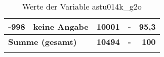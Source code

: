 \begin{longtable}{Xlrrr}
       -998 & keine Angabe & 10001 & - & 95,3 \\

     \midrule
     \multicolumn{2}{l}{\textbf{Summe (gesamt)}} & \textbf{10494} & \textbf{-} & \textbf{100} \\
     \bottomrule
     \caption{Werte der Variable astu014k\_g2o}
     \end{longtable}
     
